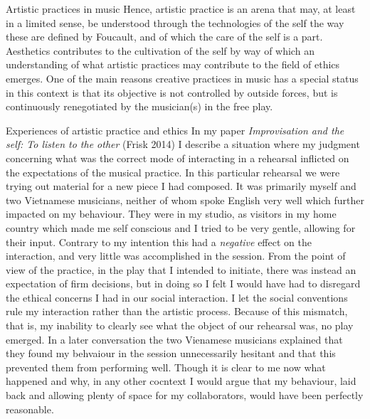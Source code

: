 \documentclass[presentation]{beamer}
\makeatletter
\newcommand{\cslcitation}[2]
 {\protect\hyper@linkstart{cite}{citeproc_bib_item_#1}#2\hyper@linkend}
\makeatother
\begin{document}
\begin{frame}[label={sec:org952e88c}]{Artistic practices in music}
Hence, artistic practice is an arena that may, at least in a limited sense, be understood through the technologies of the self the way these are defined by Foucault, and of which the care of the self is a part. Aesthetics contributes to the cultivation of the self by way of which an understanding of what artistic practices may contribute to the field of ethics emerges.
One of the main reasons creative practices in music has a special status in this context is that its objective is not controlled by outside forces, but is continuously renegotiated by the musician(s) in the free play.
\begin{block}{Experiences of artistic practice and ethics}
In my paper \emph{Improvisation and the self: To listen to the other} (\cslcitation{9}{Frisk 2014}) I describe a situation where my judgment concerning what was the correct mode of interacting in a rehearsal inflicted on the expectations of the musical practice. In this particular rehearsal we were trying out material for a new piece I had composed. It was primarily myself and two Vietnamese musicians, neither of whom spoke English very well which further impacted on my behaviour. They were in my studio, as visitors in my home country which made me self conscious and I tried to be very gentle, allowing for their input. Contrary to my intention this had a \emph{negative} effect on the interaction, and very little was accomplished in the session. From the point of view of the practice, in the play that I intended to initiate, there was instead an expectation of firm decisions, but in doing so I felt I would have had to disregard the ethical concerns I had in our social interaction. I let the social conventions rule my interaction rather than the artistic process. Because of this mismatch, that is, my inability to clearly see what the object of our rehearsal was, no play emerged. In a later conversation the two Vienamese musicians explained that they found my behvaiour in the session unnecessarily hesitant and that this prevented them from performing well. Though it is clear to me now what happened and why, in any other cocntext I would argue that my behaviour, laid back and allowing plenty of space for my collaborators, would have been perfectly reasonable. 


\end{block}
\end{frame}
\end{document}
